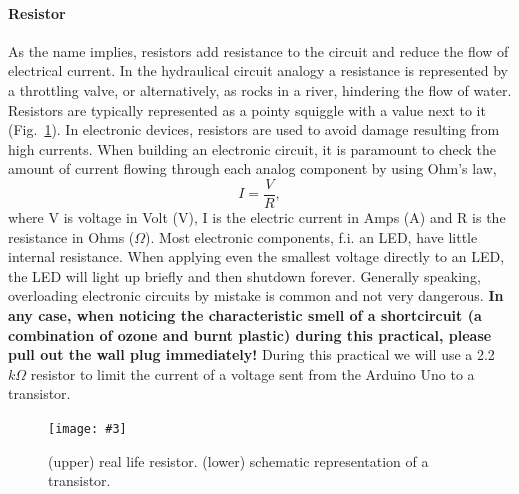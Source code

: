 \documentclass[10pt,twoside,openright]{article}
\newcommand{\mijnfiguur}[5][ht]{            %
    \begin{figure}[#1]                      %
        \begin{center}                      %
            \texttt{[image: \#3]}        %
        \end{center}
        \caption{#4\label{#5}}          %
    \end{figure}
    }
\begin{document}
\paragraph{Resistor}
As the name implies, resistors add resistance to the circuit and reduce the flow of electrical current. In the hydraulical circuit analogy a resistance is represented by a throttling valve, or alternatively, as rocks in a river, hindering the flow of water. Resistors are typically represented as a pointy squiggle with a value next to it (Fig.~\ref{fig:resistor}). In electronic devices, resistors are used to avoid damage resulting from high currents. When building an electronic circuit, it is paramount to check the amount of current flowing through each analog component by using Ohm's law,
\begin{equation}
I = \frac{V}{R},
\label{eqn:Ohms law}
\end{equation}
where V is voltage in Volt (V), I is the electric current in Amps (A) and R is the resistance in Ohms ($\Omega$). Most electronic components, f.i. an LED, have little internal resistance. When applying even the smallest voltage directly to an LED, the LED will light up briefly and then shutdown forever. Generally speaking, overloading electronic circuits by mistake is common and not very dangerous. \textbf{In any case, when noticing the characteristic smell of a shortcircuit (a combination of ozone and burnt plastic) during this practical, please pull out the wall plug immediately!} During this practical we will use a 2.2 $k\Omega$ resistor to limit the current of a voltage sent from the Arduino Uno to a transistor.
\mijnfiguur[h!]{width=6cm}{resistor.jpg}{(upper) real life resistor. (lower) schematic representation of a transistor.}{fig:resistor}
\end{document}
